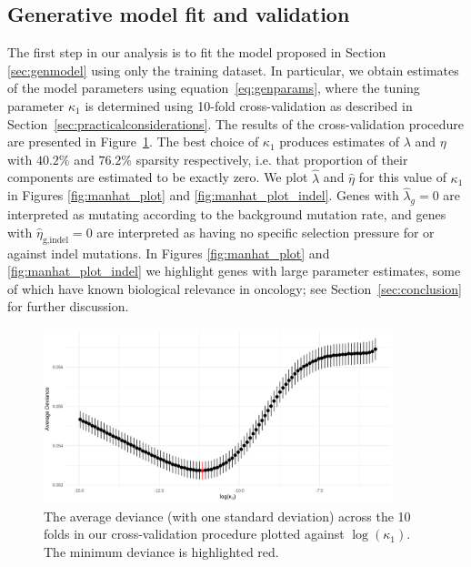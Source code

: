 \documentclass[12pt]{article}
\begin{document}

\subsection{Generative model fit and validation \label{sec:genmodelfit}}
The first step in our analysis is to fit the model proposed in Section \ref{sec:genmodel} using only the training dataset. In particular, we obtain estimates of the model parameters using equation~\eqref{eq:genparams}, where the tuning parameter $\kappa_1$ is determined using 10-fold cross-validation as described in Section~\ref{sec:practicalconsiderations}.  The results of the cross-validation procedure are presented in Figure~\ref{fig:genmodelstats}. The best choice of $\kappa_1$ produces estimates of $\lambda$ and $\eta$ with $40.2\%$ and $76.2\%$ sparsity respectively, i.e. that proportion of their components are estimated to be exactly zero. We plot $\hat{\lambda}$ and $\hat{\eta}$ for this value of $\kappa_1$ in Figures \ref{fig:manhat_plot} and \ref{fig:manhat_plot_indel}. Genes with $\hat{\lambda}_g = 0$ are interpreted as mutating according to the background mutation rate, and genes with $\hat{\eta}_{\text{g,indel}} = 0$ are interpreted as having no specific selection pressure for or against indel mutations. In Figures \ref{fig:manhat_plot} and \ref{fig:manhat_plot_indel} we highlight genes with large parameter estimates, some of which have known biological relevance in oncology; see Section~\ref{sec:conclusion} for further discussion.   
\begin{figure}[htbp]
\centering
\vspace*{-5mm}
\includegraphics[width=4in]{figures/fig3.png}
\vspace*{0mm}
\caption{The average deviance (with one standard deviation) across the 10 folds in our cross-validation procedure plotted against $\log(\kappa_1)$. The minimum deviance is highlighted red.\label{fig:genmodelstats}}
\vspace*{-2mm}
\end{figure}
\end{document}
